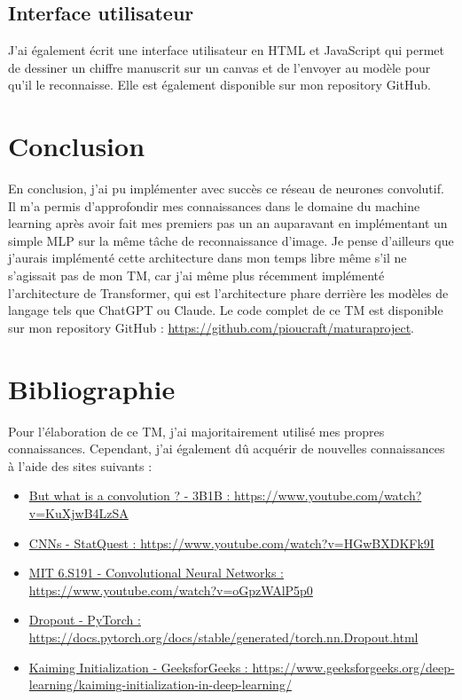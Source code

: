 \documentclass{article}
\begin{document}
\subsection{Interface utilisateur}

J'ai également écrit une interface utilisateur en HTML et JavaScript qui permet de dessiner un chiffre manuscrit sur un canvas et de l'envoyer au modèle pour qu'il le reconnaisse. Elle est également disponible sur mon repository GitHub.

\section{Conclusion}
En conclusion, j'ai pu implémenter avec succès ce réseau de neurones convolutif. Il m'a permis d'approfondir mes connaissances dans le domaine du machine learning après avoir fait mes premiers pas un an auparavant en implémentant un simple MLP sur la même tâche de reconnaissance d'image. Je pense d'ailleurs que j'aurais implémenté cette architecture dans mon temps libre même s'il ne s'agissait pas de mon TM, car j'ai même plus récemment implémenté l'architecture de Transformer, qui est l'architecture phare derrière les modèles de langage tels que ChatGPT ou Claude. Le code complet de ce TM est disponible sur mon repository GitHub : \href{https://github.com/pioucraft/maturaproject}{https://github.com/pioucraft/maturaproject}.

\section{Bibliographie}

Pour l'élaboration de ce TM, j'ai majoritairement utilisé mes propres connaissances. Cependant, j'ai également dû acquérir de nouvelles connaissances à l'aide des sites suivants :


\begin{itemize}
  \item \href{https://www.youtube.com/watch?v=KuXjwB4LzSA}{But what is a convolution ? - 3B1B : https://www.youtube.com/watch?v=KuXjwB4LzSA}
  \item \href{https://www.youtube.com/watch?v=HGwBXDKFk9I}{CNNs - StatQuest : https://www.youtube.com/watch?v=HGwBXDKFk9I}
  \item \href{https://www.youtube.com/watch?v=oGpzWAlP5p0}{MIT 6.S191 - Convolutional Neural Networks : https://www.youtube.com/watch?v=oGpzWAlP5p0}
  \item \href{https://docs.pytorch.org/docs/stable/generated/torch.nn.Dropout.html}{Dropout - PyTorch : https://docs.pytorch.org/docs/stable/generated/torch.nn.Dropout.html}
  \item \href{https://www.geeksforgeeks.org/deep-learning/kaiming-initialization-in-deep-learning/}{Kaiming Initialization - GeeksforGeeks : https://www.geeksforgeeks.org/deep-learning/kaiming-initialization-in-deep-learning/}
\end{itemize}
\end{document}
